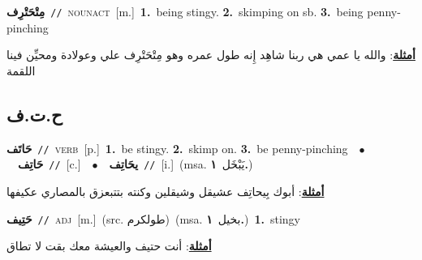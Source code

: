 \documentclass[10pt,a4paper,twoside]{article} %
\begin{document}
\begin{multicols}{2}
{\setlength\topsep{0pt}\textbf{\foreignlanguage{arabic}{مِتْحَتْرِف}}\ {\color{gray}\texttt{//}\color{black}}\ \textsc{noun\textunderscore act}\ [m.]\ \textbf{1.}~being stingy.  \textbf{2.}~skimping on sb.  \textbf{3.}~being penny-pinching\  \begin{flushright}\color{gray}\foreignlanguage{arabic}{\textbf{\underline{\foreignlanguage{arabic}{أمثلة}}}: والله يا عمي هي ربنا شاهِد إِنه طول عمره وهو مِتْحَتْرِف علي وعولادة ومحيِّن فينا اللقمة}\end{flushright}\color{black}} \vspace{2mm}

\vspace{-3mm}
\subsection*{\color{blue}\foreignlanguage{arabic}{ح.ت.ف}\color{blue}{}} 

{\setlength\topsep{0pt}\textbf{\foreignlanguage{arabic}{حَاتَف}}\ {\color{gray}\texttt{//}\color{black}}\ \textsc{verb}\ [p.]\ \textbf{1.}~be stingy.  \textbf{2.}~skimp on.  \textbf{3.}~be penny-pinching\ \ $\bullet$\ \ \setlength\topsep{0pt}\textbf{\foreignlanguage{arabic}{حَاتِف}}\ {\color{gray}\texttt{//}\color{black}}\ [c.]\ \ $\bullet$\ \ \setlength\topsep{0pt}\textbf{\foreignlanguage{arabic}{يحَاتِف}}\ {\color{gray}\texttt{//}\color{black}}\ [i.]\ \color{gray}(msa. \foreignlanguage{arabic}{يَبْخَل}~\foreignlanguage{arabic}{\textbf{١.}})\color{black}\  \begin{flushright}\color{gray}\foreignlanguage{arabic}{\textbf{\underline{\foreignlanguage{arabic}{أمثلة}}}: أبوك بِيحاتِف عشيقل وشيقلين وكنته بتتبعزق بالمصاري عكيفها}\end{flushright}\color{black}} \vspace{2mm}

{\setlength\topsep{0pt}\textbf{\foreignlanguage{arabic}{حَتِيف}}\ {\color{gray}\texttt{//}\color{black}}\ \textsc{adj}\ [m.]\ (src. \color{gray}\foreignlanguage{arabic}{طولكرم}\color{black})\ \color{gray}(msa. \foreignlanguage{arabic}{بخيل}~\foreignlanguage{arabic}{\textbf{١.}})\color{black}\ \textbf{1.}~stingy\  \begin{flushright}\color{gray}\foreignlanguage{arabic}{\textbf{\underline{\foreignlanguage{arabic}{أمثلة}}}: أنت حتيف والعيشة معك بقت لا تطاق}\end{flushright}\color{black}} \vspace{2mm}


\end{multicols}
\end{document}
